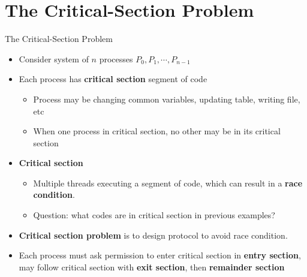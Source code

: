 \documentclass[10pt]{beamer}
\begin{document}
\section[2.CS Prob.]{The Critical-Section Problem}
\begin{frame}{The Critical-Section Problem}
\begin{itemize}
 
\item Consider system of $n$ processes $P_0, P_1, \cdots, P_{n-1}$
\item Each process has \textbf{\alert{critical section}} segment of code
\begin{itemize}
\item Process may be changing common variables, updating table, writing file, etc
\item When one process in critical section, no other may be in its critical section
\end{itemize}
\item \textbf{\alert{Critical section}}
\begin{itemize}
\item Multiple threads executing a segment of code, which can result in a \textbf{\alert{race condition}}.
\item Question: what codes are in critical section in previous examples?
\end{itemize}
\item \textbf{\alert{Critical section problem}} is to design protocol to avoid race condition.
\item Each process must ask permission to enter critical section in \textbf{\alert{entry section}}, may follow critical section with \textbf{\alert{exit section}}, then \textbf{\alert{remainder section}}
\end{itemize}
\end{frame}
\end{document}
